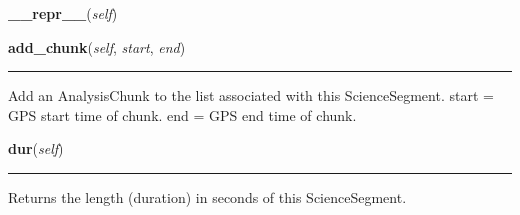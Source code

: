     \label{pipeline:ScienceSegment:__repr__}
    \vspace{0.5ex}

    \noindent\begin{boxedminipage}{\textwidth}

    \raggedright \textbf{\_\_repr\_\_}(\textit{self})

    \end{boxedminipage}

    \label{pipeline:ScienceSegment:add_chunk}
    \vspace{0.5ex}

    \noindent\begin{boxedminipage}{\textwidth}

    \raggedright \textbf{add\_chunk}(\textit{self}, \textit{start}, \textit{end})

    \vspace{-1.5ex}

    \rule{\textwidth}{0.5\fboxrule}
    Add an AnalysisChunk to the list associated with this ScienceSegment. 
    start = GPS start time of chunk. end = GPS end time of chunk.

    \vspace{1ex}

    \end{boxedminipage}

    \label{pipeline:ScienceSegment:dur}
    \vspace{0.5ex}

    \noindent\begin{boxedminipage}{\textwidth}

    \raggedright \textbf{dur}(\textit{self})

    \vspace{-1.5ex}

    \rule{\textwidth}{0.5\fboxrule}
    Returns the length (duration) in seconds of this ScienceSegment.

    \vspace{1ex}

    \end{boxedminipage}

    \label{pipeline:ScienceSegment:end}
    \vspace{0.5ex}

